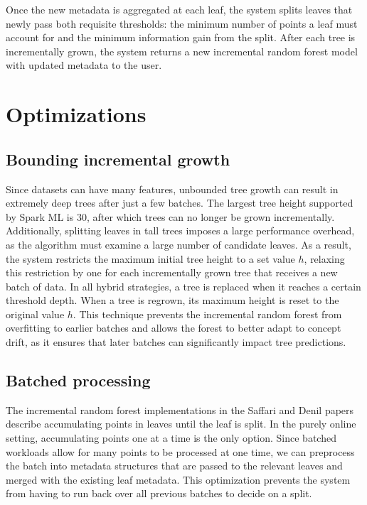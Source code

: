 Once the new metadata is aggregated at each leaf, the system splits leaves that
newly pass both requisite thresholds: the minimum number of points a leaf must
account for and the minimum information gain from the split. After each tree is
incrementally grown, the system returns a new incremental random forest model
with updated metadata to the user.

\section{Optimizations}

\subsection{Bounding incremental growth}

Since datasets can have many features, unbounded tree growth can result in
extremely deep trees after just a few batches. The largest tree height
supported by Spark ML is 30, after which trees can no longer be grown
incrementally. Additionally, splitting leaves in tall trees imposes a large
performance overhead, as the algorithm must examine a large number of candidate
leaves. As a result, the system restricts the maximum initial tree height to a
set value $h$, relaxing this restriction by one for each incrementally grown
tree that receives a new batch of data. In all hybrid strategies, a tree is
replaced when it reaches a certain threshold depth. When a tree is regrown, its
maximum height is reset to the original value $h$. This technique prevents the
incremental random forest from overfitting to earlier batches and allows the
forest to better adapt to concept drift, as it ensures that later batches can
significantly impact tree predictions.

\subsection{Batched processing}

The incremental random forest implementations in the Saffari and Denil papers
describe accumulating points in leaves until the leaf is split. In the purely
online setting, accumulating points one at a time is the only option. Since
batched workloads allow for many points to be processed at one time, we can
preprocess the batch into metadata structures that are passed to the relevant
leaves and merged with the existing leaf metadata. This optimization prevents
the system from having to run back over all previous batches to decide on a
split.

